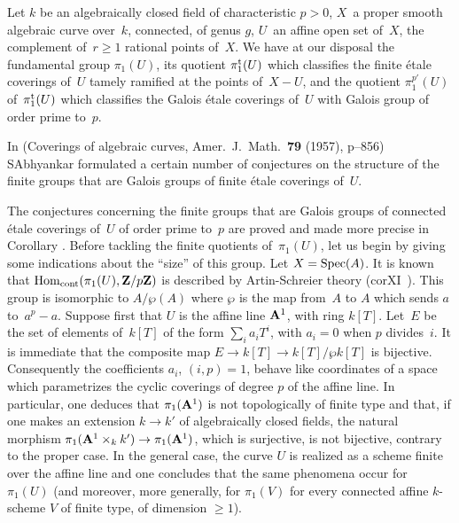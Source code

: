 \begin{remarkMR}
\label{XIII.2.13}
Let $k$ be an algebraically closed field of characteristic $p>0$, $X$~a proper smooth algebraic curve over~$k$, connected, of genus $g$, $U$~an affine open set of~$X$, the complement of~$r\geq1$ rational points
of~$X$. We have at our disposal the fundamental group $\pi_1(U)$, its quotient
$\pi_1^{\tame}(U)$ which classifies the finite \'etale coverings of~$U$
tamely ramified at the points of~$X-U$, and the quotient
$\pi_1^{p'}(U)$ of~$\pi_1^{\tame}(U)$ which classifies the Galois
\'etale coverings of~$U$ with Galois group of order prime to~$p$.

In (Coverings of algebraic curves, Amer.\ J.~Math.\ \textbf{79}
(1957), p--856) S\ptbl Abhyankar formulated a certain number of conjectures on the structure of the finite groups that are Galois groups of finite
\'etale coverings of~$U$.

The conjectures concerning the finite groups that are Galois groups
of connected \'etale coverings of~$U$ of order prime to~$p$
are proved and made more precise in Corollary . Before tackling the finite quotients of~$\pi_1(U)$, let us begin by giving some
indications about the ``size'' of this group. Let $X = \Spec(A)$. It is
known that $\Hom_{\mathrm{cont}}(\pi_1(U), \ZZ/p\ZZ)$ is described by
Artin-Schreier theory (cor\ptbl XI~). This group is
isomorphic to $A/\wp(A)$ where $\wp$ is the map from~$A$ to $A$ which
sends $a$ to~$a^p-a$. Suppose first that $U$ is the affine
line $\AA^1$, with ring $k[T]$. Let~$E$ be the set of
elements of~$k[T]$ of the form $\sum_i a_iT^i$, with $a_i = 0$
when $p$ divides~$i$. It is immediate that the composite map
$E\to k[T]\to k[T]/\wp k[T]$ is bijective. Consequently the coefficients
$a_i$, $(i,p)=1$, behave like coordinates of a space which
parametrizes the cyclic coverings of degree
$p$ of the affine line. In particular, one deduces that $\pi_1(\AA^1)$ is not
topologically of finite type and that, if one makes an extension
$k\to k'$ of algebraically closed fields, the natural morphism $\pi_1(\AA^1\times_kk')\to\pi_1(\AA^1)$, which is surjective, is not bijective,
contrary to the proper case. In the general case, the curve $U$ is
realized as a scheme finite over the affine line and one concludes that the
same phenomena occur for $\pi_1(U)$ (and moreover, more
generally, for $\pi_1(V)$ for every connected affine $k$-scheme $V$
of finite type, of dimension $\geq1$).


\end{remarkMR}
